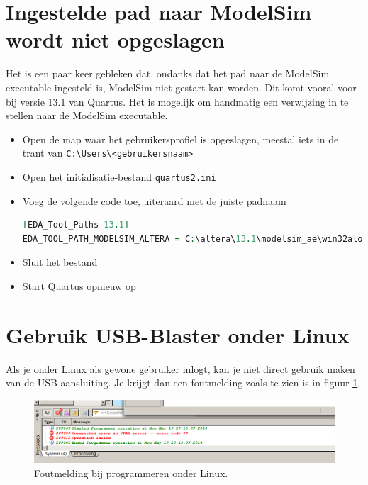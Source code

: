 \documentclass[a4paper,12pt,fleqn,twoside]{book}
\def\tutpicscale{0.455}
\begin{document}
\fi


\section{Ingestelde pad naar ModelSim wordt niet opgeslagen}
\label{sec:ingesteldepadnaarmodelsimwordtnietopgeslagen}
Het is een paar keer gebleken dat, ondanks dat het pad naar de ModelSim
executable ingesteld is, ModelSim niet gestart kan worden. Dit komt vooral
voor bij versie 13.1 van Quartus. Het is mogelijk om handmatig een
verwijzing in te stellen naar de ModelSim executable.

\begin{itemize}\itemsep-1pt
\item Open de map waar het gebruikersprofiel is opgeslagen, meestal iets in
      de trant van \lstinline|C:\Users\<gebruikersnaam>|
\item Open het initialisatie-bestand \lstinline|quartus2.ini|
\item Voeg de volgende code toe, uiteraard met de juiste padnaam
\begin{lstlisting}[language=VHDL,numbers=none,belowskip=-3.5ex]
[EDA_Tool_Paths 13.1]
EDA_TOOL_PATH_MODELSIM_ALTERA = C:\altera\13.1\modelsim_ae\win32aloem
\end{lstlisting}
\item Sluit het bestand
\item Start Quartus opnieuw op

\end{itemize}


\section{Gebruik USB-Blaster onder Linux}
\label{sec:gebruikvanusbblasteronderlinux}
Als je onder Linux als gewone gebruiker inlogt, kan je niet direct gebruik
maken van de USB-aansluiting. Je krijgt dan een foutmelding zoals te zien is
in figuur \ref{fig:230jtagerror89}.


\begin{figure}[H]
\centering
\includegraphics[scale=\tutpicscale]{231Aquartus_errorCode_89}
\caption{Foutmelding bij programmeren onder Linux.}
\label{fig:230jtagerror89}
\end{figure}
\end{document}
